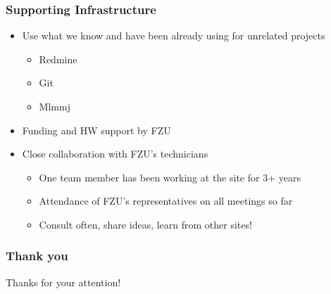 \documentclass{beamer}
\begin{document}
\begin{frame}
\frametitle{Supporting Infrastructure}

\begin{itemize}
    \item Use what we know and have been already using for unrelated projects
        \begin{itemize}
            \item Redmine
            \item Git
            \item Mlmmj
        \end{itemize}
    \item Funding and HW support by FZU
    \item Close collaboration with FZU's technicians
        \begin{itemize}
            \item One team member has been working at the site for 3+ years
            \item Attendance of FZU's representatives on all meetings so far
            \item Consult often, share ideas, learn from other sites!
        \end{itemize}
\end{itemize}
\end{frame}

\begin{frame}
\frametitle{Thank you}

\center
{\Large Thanks for your attention!}

\end{frame}
\end{document}
